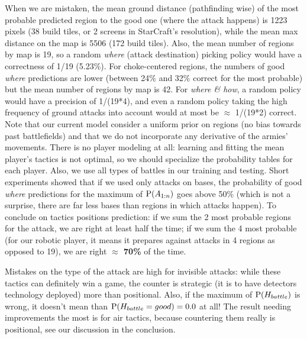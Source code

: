 When we are mistaken, the mean ground distance (pathfinding wise) of the most probable predicted region to the good one (where the attack happens) is 1223 pixels (38 build tiles, or 2 screens in StarCraft's resolution), while the mean max distance on the map is 5506 (172 build tiles). Also, the mean number of regions by map is 19, so a random \textit{where} (attack destination) picking policy would have a correctness of 1/19 (5.23\%). For choke-centered regions, the numbers of good \textit{where} predictions are lower (between 24\% and 32\% correct for the most probable) but the mean number of regions by map is 42. For \textit{where \& how}, a random policy would have a precision of 1/(19*4), and even a random policy taking the high frequency of ground attacks into account would at most be $\approx$ 1/(19*2) correct.
Note that our current model consider a uniform prior on regions (no bias towards past battlefields) and that we do not incorporate any derivative of the armies' movements. There is no player modeling at all: learning and fitting the mean player's tactics is not optimal, so we should specialize the probability tables for each player. Also, we use all types of battles in our training and testing. Short experiments showed that if we used only attacks on bases, the probability of good \textit{where} predictions for the maximum of $\mathrm{P}(A_{1:n})$ goes above 50\% (which is not a surprise, there are far less bases than regions in which attacks happen). To conclude on tactics positions prediction: if we sum the 2 most probable regions for the attack, we are right at least half the time; if we sum the 4 most probable (for our robotic player, it means it prepares against attacks in 4 regions as opposed to 19), we are right \textbf{$\approx$ 70\%} of the time.

Mistakes on the type of the attack are high for invisible attacks: while these tactics can definitely win a game, the counter is strategic (it is to have detectors technology deployed) more than positional. Also, if the maximum of $\mathrm{P}(H_{battle})$ is wrong, it doesn't mean than $\mathrm{P}(H_{battle}=good)=0.0$ at all! The result needing improvements the most is for air tactics, because countering them really is positional, see our discussion in the conclusion.

